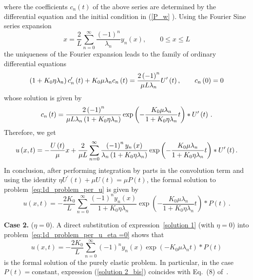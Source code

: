 \documentclass[12pt,a4paper]{amsart}
\theoremstyle{definition}
\begin{document}
where the coefficients $c_{n}\left( t\right) $ of the above series are determined
by the differential equation and the initial condition in (\ref{P_w}%
). Using the Fourier Sine series expansion%
\begin{equation*}
x=\frac{2}{L}\sum_{n=0}^{\infty }\frac{\left( -1\right) ^{n}}{\lambda _{n}}%
y_{n}\left( x\right) ,\qquad 0\leq x\leq L
\end{equation*}%
the uniqueness of the Fourier expansion leads to the family of ordinary differential equations%
\begin{equation*}
\left( 1+K_{0}\eta \lambda _{n}\right) c_{n}^{\prime }\left( t\right)
+K_{0}\mu \lambda _{n}c_{n}\left( t\right) =\frac{2\left( -1\right) ^{n}}{%
\mu L\lambda _{n}}U^{\prime }\left( t\right) ,\qquad c_{n}\left( 0\right) =0
\end{equation*}%
whose solution is given by%
\begin{equation*}
c_{n}\left( t\right) =\frac{2\left( -1\right) ^{n}}{\mu L\lambda _{n}\left(
1+K_{0}\eta \lambda _{n}\right) }\exp \left( -\frac{K_{0}\mu \lambda _{n}}{%
1+K_{0}\eta \lambda _{n}}t\right) \ast U^{\prime }\left( t\right)\,.
\end{equation*}%
Therefore, we get
\begin{equation*}
u\left( x,t\right) =-\frac{U\left( t\right) }{\mu }x+\frac{2}{\mu L}%
\sum_{n=0}^{\infty }\frac{\left( -1\right) ^{n}y_{n}\left( x\right) }{%
\lambda _{n}\left( 1+K_{0}\eta \lambda _{n}\right) }\exp \left( -\frac{%
K_{0}\mu \lambda _{n}}{1+K_{0}\eta \lambda _{n}}t\right) \ast U^{\prime
}\left( t\right) .
\end{equation*}
In conclusion, after performing integration by parts in the convolution term and using the
identity $\eta U^{\prime }\left( t\right) +\mu U\left( t\right) =\mu P\left(
t\right) $, the formal solution to problem~\eqref{eq:1d_problem_per_u} is given by
\begin{equation}
u\left( x,t\right) =-\frac{2K_{0}}{L}\sum_{n=0}^{\infty }\frac{\left(
-1\right) ^{n}y_{n}\left( x\right) }{1+K_{0}\eta \lambda _{n}}\exp \left( -%
\frac{K_{0}\mu \lambda _{n}}{1+K_{0}\eta \lambda _{n}}t\right) \ast P\left(
t\right) \,.  \label{solution 1}
\end{equation}

{\bf Case 2.} ($\eta =0$).
A direct substitution of expression~\eqref{solution 1} (with $\eta=0$)
into problem~\eqref{eq:1d_problem_per_u_eta =0} shows that
\begin{equation}
u\left( x,t\right) =-\frac{2K_{0}}{L}\sum_{n=0}^{\infty }
\left(-1\right) ^{n}y_{n}\left( x\right) \exp \left(-K_{0}\mu \lambda _{n} t\right)
\ast P\left( t\right)   \label{solution 2_bis}
\end{equation}
is the formal solution of the purely elastic problem.
In particular, in the case $P(t)=\mathrm{constant}$,
expression (\ref{solution 2_bis}) coincides with Eq.~(8) of~\cite{Soltz1998}.
\end{document}
